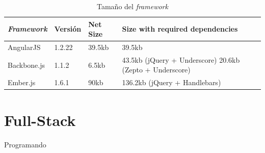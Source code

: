 \begin{table}[h!]
    \tiny
\begin{tabular}{ |L{0.1\paperwidth}|L{0.2\paperwidth}|L{0.2\paperwidth}|L{0.2\paperwidth}|}
\hline
	\textit{Framework}&
	Versión &
	Net Size &
	Size with required dependencies
	
\\ \hline
	AngularJS&
	1.2.22&
	39.5kb&
	39.5kb
\\ \hline
	Backbone.js&
	1.1.2&
	6.5kb&
	43.5kb (jQuery + Underscore) 20.6kb (Zepto + Underscore)
	
\\ \hline
	Ember.js&
	1.6.1&
	90kb&
	136.2kb (jQuery + Handlebars)
	
\\ \hline
\end{tabular}
    \caption{ Tamaño del \textit{framework}}
    \label{tab:framework_size}
\end{table}


\section{Full-Stack }

Programando 

